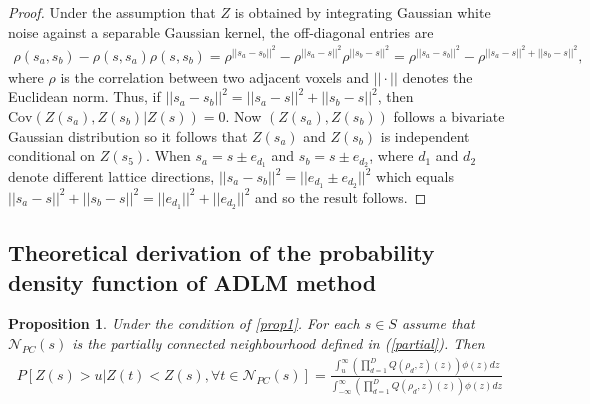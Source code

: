 \documentclass{article}
\newtheorem{Proposition}[theorem]{Proposition}
\newcommand{\Cov}{\mathrm{Cov}}
\begin{document}
\begin{proof}
Under the assumption that $Z$ is obtained by integrating Gaussian white noise against a separable Gaussian kernel, the off-diagonal entries are 
\begin{align*}
    \rho(s_a, s_b) - \rho(s, s_a)\rho(s, s_b) = \rho^{||s_a-s_b||^2} - \rho^{||s_a-s||^2}\rho^{||s_b-s||^2} = \rho^{||s_a-s_b||^2} - \rho^{||s_a-s||^2 + ||s_b-s||^2},
\end{align*}
where $\rho$ is the correlation between two adjacent voxels and $||\cdot||$ denotes the Euclidean norm. Thus, if $||s_a-s_b||^2 = ||s_a-s||^2 + ||s_b-s||^2$, then $\Cov(Z(s_a), Z(s_b)|Z(s)) = 0$. Now $(Z(s_a), Z(s_b))$ follows a bivariate Gaussian distribution so it follows that $Z(s_a)$ and $Z(s_b)$ is independent conditional on $Z(s_5)$. When $s_a = s\pm e_{d_1}$ and $s_b = s\pm e_{d_2}$, where $d_1$ and $d_2$ denote different lattice directions, $||s_a-s_b||^2 = ||e_{d_1} \pm e_{d_2}||^2$ which equals $||s_a-s||^2 + ||s_b-s||^2 = ||e_{d_1}||^2 + ||e_{d_2}||^2$ and so the result follows. 
\end{proof}

\subsection{Theoretical derivation of the probability density function of ADLM method\label{appendix.a2}}
\begin{Proposition}
Under the condition of \ref{prop1}. For each $s \in S$ assume that $\mathcal{N}_{PC}(s)$ is the partially connected neighbourhood defined in (\ref{partial}). Then 
\begin{align*}
    P [Z(s) > u|Z(t) < Z(s), \forall t \in \mathcal{N}_{PC}(s)] = \frac{\int_u^\infty\left(\prod_{d=1}^DQ(\rho_d,z)(z)\right)\phi(z)dz}{\int_{-\infty}^\infty\left(\prod_{d=1}^DQ(\rho_d,z)(z)\right)\phi(z)dz}
\end{align*}
\end{Proposition}
\end{document}
